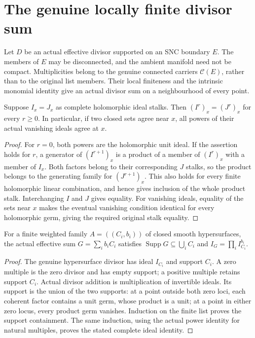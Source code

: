 \section{The genuine locally finite divisor sum}
\label{sec:hironaka-locally-finite-divisor-sum}

Let $D$ be an actual effective divisor supported on an SNC boundary $E$.
The members of $E$ may be disconnected, and the ambient manifold need
not be compact.  Multiplicities belong to the genuine connected carriers
$\mathcal C(E)$, rather than to the original list members.  Their local
finiteness and the intrinsic monomial identity give an actual divisor
sum on a neighbourhood of every point.

\begin{lemma}
\label{hir:ideal-power-stalk-congruence}
\leanok
Suppose $I_x=J_x$ as complete holomorphic ideal stalks.  Then
$(I^r)_x=(J^r)_x$ for every $r\ge0$.  In particular, if two closed sets
agree near $x$, all powers of their actual vanishing ideals agree at $x$.
\end{lemma}
\begin{proof}
For $r=0$, both powers are the holomorphic unit ideal.  If the assertion
holds for $r$, a generator of $(I^{r+1})_x$ is a product of a member of
$(I^r)_x$ with a member of $I_x$.  Both factors belong to their corresponding
$J$ stalks, so the product belongs to the generating family for
$(J^{r+1})_x$.  This also holds for every finite holomorphic linear
combination, and hence gives inclusion of the whole product stalk.
Interchanging $I$ and $J$ gives equality.  For vanishing ideals, equality
of the sets near $x$ makes the eventual vanishing condition identical
for every holomorphic germ, giving the required original stalk equality.
\end{proof}

\begin{lemma}
\label{hir:finite-component-sum-support-containment}
\leanok
For a finite weighted family $A=((C_i,b_i))$ of closed smooth
hypersurfaces, the actual effective sum $G=\sum_i b_i C_i$ satisfies
$\operatorname{Supp}G\subseteq\bigcup_i C_i$ and
$I_G=\prod_i I_{C_i}^{b_i}$.
\end{lemma}
\begin{proof}
The genuine hypersurface divisor has ideal $I_{C_i}$ and support $C_i$.
A zero multiple is the zero divisor and has empty support; a positive
multiple retains support $C_i$.  Actual divisor addition is multiplication
of invertible ideals.  Its support is the union of the two supports:
at a point outside both zero loci, each coherent factor contains a unit
germ, whose product is a unit; at a point in either zero locus, every
product germ vanishes.  Induction on the finite list proves the support
containment.  The same induction, using the actual power identity for
natural multiples, proves the stated complete ideal identity.
\end{proof}

